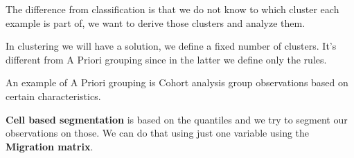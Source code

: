The difference from classification is that we do not know to which cluster each example is part of, we want to derive those clusters and analyze them.

In clustering we will have a solution, we define a fixed number of clusters. It's different from A Priori grouping since in the latter we define only the rules.

\vspace{10pt}

An example of A Priori grouping is Cohort analysis \ra group observations based on certain characteristics. 

\vspace{10pt}

\textbf{Cell based segmentation} is based on the quantiles and we try to segment our observations on those. 
We can do that using just one variable using the \textbf{Migration matrix}.

